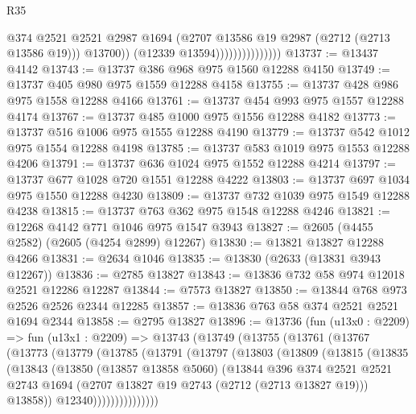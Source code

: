 \begin{lexlean}{R35}
\begin{coremodule}
                                    @374
                                    @2521
                                    @2521
                                    @2987
                                    @1694
                                    (@2707 @13586 @19 @2987 (@2712 (@2713 @13586 @19)))
                                    @13700))
                                (@12339 @13594)))))))))))))))
@13737 := @13437 @4142
@13743 := @13737 @386 @968 @975 @1560 @12288 @4150
@13749 := @13737 @405 @980 @975 @1559 @12288 @4158
@13755 := @13737 @428 @986 @975 @1558 @12288 @4166
@13761 := @13737 @454 @993 @975 @1557 @12288 @4174
@13767 := @13737 @485 @1000 @975 @1556 @12288 @4182
@13773 := @13737 @516 @1006 @975 @1555 @12288 @4190
@13779 := @13737 @542 @1012 @975 @1554 @12288 @4198
@13785 := @13737 @583 @1019 @975 @1553 @12288 @4206
@13791 := @13737 @636 @1024 @975 @1552 @12288 @4214
@13797 := @13737 @677 @1028 @720 @1551 @12288 @4222
@13803 := @13737 @697 @1034 @975 @1550 @12288 @4230
@13809 := @13737 @732 @1039 @975 @1549 @12288 @4238
@13815 := @13737 @763 @362 @975 @1548 @12288 @4246
@13821 := @12268 @4142 @771 @1046 @975 @1547 @3943
@13827 := @2605 (@4455 @2582) (@2605 (@4254 @2899) @12267)
@13830 := @13821 @13827 @12288 @4266
@13831 := @2634 @1046
@13835 := @13830 (@2633 (@13831 @3943 @12267))
@13836 := @2785 @13827
@13843 := @13836 @732 @58 @974 @12018 @2521 @12286 @12287
@13844 := @7573 @13827
@13850 := @13844 @768 @973 @2526 @2526 @2344 @12285
@13857 := @13836 @763 @58 @374 @2521 @2521 @1694 @2344
@13858 := @2795 @13827
@13896 := @13736
    (fun (u13x0 : @2209) =>
    fun (u13x1 : @2209) =>
    @13743
      (@13749
        (@13755
          (@13761
            (@13767
              (@13773
                (@13779
                  (@13785
                    (@13791
                      (@13797
                        (@13803
                          (@13809
                            (@13815
                              (@13835
                                (@13843
                                  (@13850
                                    (@13857 @13858 @5060)
                                    (@13844
                                      @396
                                      @374
                                      @2521
                                      @2521
                                      @2743
                                      @1694
                                      (@2707 @13827 @19 @2743 (@2712 (@2713 @13827 @19)))
                                      @13858))
                                  @12340)))))))))))))))

\end{coremodule}
\end{lexlean}

